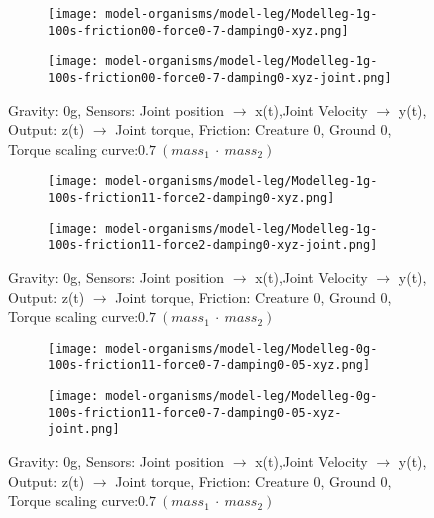 \documentclass[main]{subfiles}
\begin{document}
\begin{figure}[H]
	\centering
		\begin{subfigure}[c]{0.45\textwidth}
	\texttt{[image: model-organisms/model-leg/Modelleg-1g-100s-friction00-force0-7-damping0-xyz.png]}
		\end{subfigure}
	\begin{subfigure}[c]{0.45\textwidth}
	\texttt{[image: model-organisms/model-leg/Modelleg-1g-100s-friction00-force0-7-damping0-xyz-joint.png]}
		\end{subfigure}
	\caption[Figure of chaotic behaviors in range 2.4-3.19]{Gravity: 0g, Sensors:  Joint position \(\rightarrow\) x(t),Joint Velocity \(\rightarrow\) y(t), Output: z(t) \(\rightarrow\) Joint torque, Friction: Creature 0, Ground 0, Torque scaling curve:\(0.7~(mass_1~\cdot~mass_2)\)}

	\label{figure:z-2.4-3.19-chaotictrajectories}
\end{figure}

\begin{figure}[H]
	\centering
		\begin{subfigure}[c]{0.45\textwidth}
	\texttt{[image: model-organisms/model-leg/Modelleg-1g-100s-friction11-force2-damping0-xyz.png]}
		\end{subfigure}
	\begin{subfigure}[c]{0.45\textwidth}
	\texttt{[image: model-organisms/model-leg/Modelleg-1g-100s-friction11-force2-damping0-xyz-joint.png]}
		\end{subfigure}
	\caption[Figure of chaotic behaviors in range 2.4-3.19]{Gravity: 0g, Sensors:  Joint position \(\rightarrow\) x(t),Joint Velocity \(\rightarrow\) y(t), Output: z(t) \(\rightarrow\) Joint torque, Friction: Creature 0, Ground 0, Torque scaling curve:\(0.7~(mass_1~\cdot~mass_2)\)}

	\label{figure:z-2.4-3.19-chaotictrajectories}
\end{figure}

\begin{figure}[H]
	\centering
		\begin{subfigure}[c]{0.45\textwidth}
	\texttt{[image: model-organisms/model-leg/Modelleg-0g-100s-friction11-force0-7-damping0-05-xyz.png]}
		\end{subfigure}
	\begin{subfigure}[c]{0.45\textwidth}
	\texttt{[image: model-organisms/model-leg/Modelleg-0g-100s-friction11-force0-7-damping0-05-xyz-joint.png]}
		\end{subfigure}
	\caption[Figure of chaotic behaviors in range 2.4-3.19]{Gravity: 0g, Sensors:  Joint position \(\rightarrow\) x(t),Joint Velocity \(\rightarrow\) y(t), Output: z(t) \(\rightarrow\) Joint torque, Friction: Creature 0, Ground 0, Torque scaling curve:\(0.7~(mass_1~\cdot~mass_2)\)}

	\label{figure:z-2.4-3.19-chaotictrajectories}
\end{figure}
\end{document}
